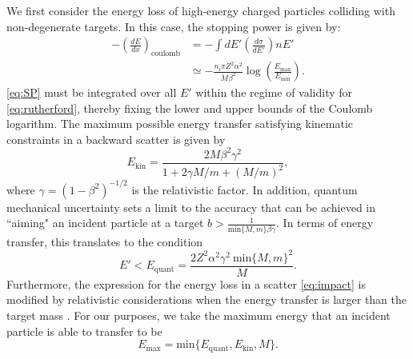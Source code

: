 \documentclass[twocolumn,showpacs,preprintnumbers,amsmath,amssymb,prd]{revtex4}
\def\r{\right)}
\def\l{\left(}
\begin{document}
\begin{appendices}
We first consider the energy loss of high-energy charged particles colliding with non-degenerate targets. In this case, the stopping power is given by:
\begin{align}
\label{eq:SP}
-\l \frac{dE}{dx}\r_\text{coulomb} & = - \int dE' \left(\frac{d \sigma}{dE'}\right) n E' \\
& \simeq -\frac{n_i \pi Z^2 \alpha^2}{M \beta^2} \log {\l\frac{E_{\text{max}}}{E_{\text{min}}}\r}.
\end{align}
\eqref{eq:SP} must be integrated over all $E'$ within the regime of validity for \eqref{eq:rutherford}, thereby fixing the lower and upper bounds of the Coulomb logarithm. The maximum possible energy transfer satisfying kinematic constraints in a backward scatter is given by
\begin{equation}
E_{\text{kin}} = \frac{2 M \beta^2 \gamma^2}{1+ 2\gamma M/m +(M/m)^2},
\end{equation}
where $\gamma = (1-\beta^2)^{-1/2}$ is the relativistic factor. In addition, quantum mechanical uncertainty sets a limit to the accuracy that can be achieved in ``aiming" an incident particle at a target $b > \frac{1}{\text{min}\{{M, m}\} \beta \gamma}$. In terms of energy transfer, this translates to the condition
\begin{equation}
E' < E_\text{quant} = \frac{2 Z^2 \alpha^2 \gamma^2 ~\text{min}\{{M, m}\}^2}{M}.
\end{equation}
Furthermore, the expression for the energy loss in a scatter \eqref{eq:impact} is modified by relativistic considerations when the energy transfer is larger than the target mass \cite{Rossi}. For our purposes, we take the maximum energy that an incident particle is able to transfer to be
\begin{equation}
E_{\text{max}} = \text{min}\{E_\text{quant}, E_{\text{kin}}, M\}.
\end{equation}


\end{appendices}
\end{document}
